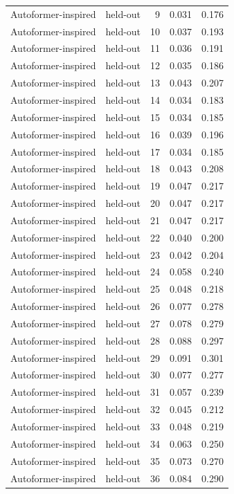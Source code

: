 \begin{tabular}{llrrr}
Autoformer-inspired & held-out & 9 & 0.031 & 0.176 \\
Autoformer-inspired & held-out & 10 & 0.037 & 0.193 \\
Autoformer-inspired & held-out & 11 & 0.036 & 0.191 \\
Autoformer-inspired & held-out & 12 & 0.035 & 0.186 \\
Autoformer-inspired & held-out & 13 & 0.043 & 0.207 \\
Autoformer-inspired & held-out & 14 & 0.034 & 0.183 \\
Autoformer-inspired & held-out & 15 & 0.034 & 0.185 \\
Autoformer-inspired & held-out & 16 & 0.039 & 0.196 \\
Autoformer-inspired & held-out & 17 & 0.034 & 0.185 \\
Autoformer-inspired & held-out & 18 & 0.043 & 0.208 \\
Autoformer-inspired & held-out & 19 & 0.047 & 0.217 \\
Autoformer-inspired & held-out & 20 & 0.047 & 0.217 \\
Autoformer-inspired & held-out & 21 & 0.047 & 0.217 \\
Autoformer-inspired & held-out & 22 & 0.040 & 0.200 \\
Autoformer-inspired & held-out & 23 & 0.042 & 0.204 \\
Autoformer-inspired & held-out & 24 & 0.058 & 0.240 \\
Autoformer-inspired & held-out & 25 & 0.048 & 0.218 \\
Autoformer-inspired & held-out & 26 & 0.077 & 0.278 \\
Autoformer-inspired & held-out & 27 & 0.078 & 0.279 \\
Autoformer-inspired & held-out & 28 & 0.088 & 0.297 \\
Autoformer-inspired & held-out & 29 & 0.091 & 0.301 \\
Autoformer-inspired & held-out & 30 & 0.077 & 0.277 \\
Autoformer-inspired & held-out & 31 & 0.057 & 0.239 \\
Autoformer-inspired & held-out & 32 & 0.045 & 0.212 \\
Autoformer-inspired & held-out & 33 & 0.048 & 0.219 \\
Autoformer-inspired & held-out & 34 & 0.063 & 0.250 \\
Autoformer-inspired & held-out & 35 & 0.073 & 0.270 \\
Autoformer-inspired & held-out & 36 & 0.084 & 0.290 \\

\end{tabular}
